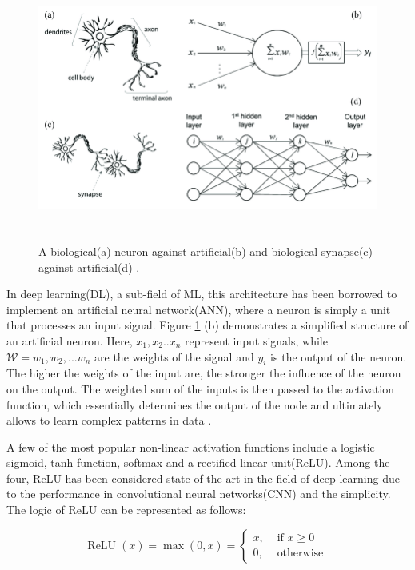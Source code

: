 \documentclass[english, 12pt, a4paper, elec, utf8, a-1b, online]{aaltothesis}
\begin{document}
\begin{figure}[htb]
	\begin{center}
		\includegraphics[height=8cm]{./BioNeuronVsArtificial.png}
	\end{center}
	\caption{A biological(a) neuron against artificial(b) and biological synapse(c) against artificial(d) \cite{article1}.}
	\begin{center}
		\label{NeuronSchem}
	\end{center}
\end{figure}
\FloatBarrier

In deep learning(DL), a sub-field of ML, this architecture has been borrowed to implement an artificial neural network(ANN), where a neuron is simply a unit that processes an input signal. Figure \ref{NeuronSchem} (b) demonstrates a simplified structure of an artificial neuron. Here, $x_1, x_2..x_n$ represent input signals, while $\mathcal{W} = w_1, w_2, ... w_n$ are the weights of the signal and $y_i$ is the output of the neuron. The higher the weights of the input are, the stronger the influence of the neuron on the output. The weighted sum of the inputs is then passed to the activation function, which essentially determines the output of the node and ultimately allows to learn complex patterns in data \cite{Mehlig_2021}. 

A few of the most popular non-linear activation functions include a logistic sigmoid, tanh function, softmax and a rectified linear unit(ReLU). Among the four, ReLU has been considered state-of-the-art in the field of deep learning due to the performance in convolutional neural networks(CNN) \cite{Dubey2021} and the simplicity. The logic of ReLU can be represented as follows: 
  
\begin{equation}
	\operatorname{ReLU}(x)=\max (0, x)= \begin{cases}x, & \text { if } x \geq 0 \\ 0, & \text { otherwise }\end{cases}
\end{equation}
\end{document}
